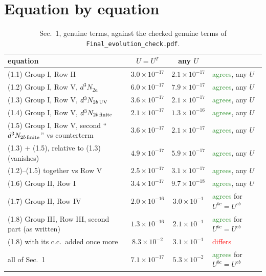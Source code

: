 \documentclass[10pt]{article}
\numberwithin{equation}{section}
\begin{document}
\section{Equation by equation}
\begin{table}[H]\centering\small
\caption{Sec.~1, genuine terms, against the checked genuine terms of \texttt{Final\_evolution\_check.pdf}.}\label{tab:gen}
\begin{tabular}{@{}lccl@{}}\toprule
equation & $U=U^T$ & any $U$ & \\\midrule
(1.1) Group I, Row II & $3.0\times10^{-17}$ & $2.1\times10^{-17}$ & \textcolor{ForestGreen}{agrees}, any $U$\\
(1.2) Group I, Row V, $d^3N_{2a}$ & $6.0\times10^{-17}$ & $7.9\times10^{-17}$ & \textcolor{ForestGreen}{agrees}, any $U$\\
(1.3) Group I, Row V, $d^3N_{2b\,\rm UV}$ & $3.6\times10^{-17}$ & $2.1\times10^{-17}$ & \textcolor{ForestGreen}{agrees}, any $U$\\
(1.4) Group I, Row V, $d^3N_{2b\,\rm finite}$ & $2.1\times10^{-17}$ & $1.3\times10^{-16}$ & \textcolor{ForestGreen}{agrees}, any $U$\\
(1.5) Group I, Row V, second ``$d^3N_{2b\,\rm finite}$'' vs counterterm & $3.6\times10^{-17}$ & $2.1\times10^{-17}$ & \textcolor{ForestGreen}{agrees}, any $U$\\
(1.3) + (1.5), relative to (1.3) (vanishes) & $4.9\times10^{-17}$ & $5.9\times10^{-17}$ & \textcolor{ForestGreen}{agrees}, any $U$\\
(1.2)--(1.5) together vs Row V & $2.5\times10^{-17}$ & $3.1\times10^{-17}$ & \textcolor{ForestGreen}{agrees}, any $U$\\
(1.6) Group II, Row I & $3.4\times10^{-17}$ & $9.7\times10^{-18}$ & \textcolor{ForestGreen}{agrees}, any $U$\\
(1.7) Group II, Row IV & $2.0\times10^{-16}$ & $3.0\times10^{-1}$ & \textcolor{ForestGreen}{agrees} for $U^{bc}=U^{cb}$\\
(1.8) Group III, Row III, second part (as written) & $1.3\times10^{-16}$ & $2.1\times10^{-1}$ & \textcolor{ForestGreen}{agrees} for $U^{bc}=U^{cb}$\\
(1.8) with its c.c.\ added once more & $8.3\times10^{-2}$ & $3.1\times10^{-1}$ & \textcolor{red}{differs}\\
\midrule
all of Sec.~1 & $7.1\times10^{-17}$ & $5.3\times10^{-2}$ & \textcolor{ForestGreen}{agrees} for $U^{bc}=U^{cb}$\\
\bottomrule
\end{tabular}
\end{table}
\end{document}
